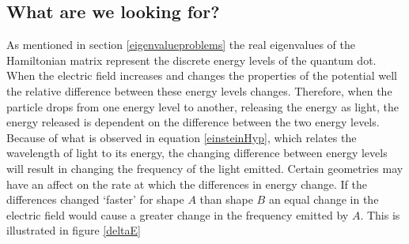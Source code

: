\documentclass[authoryearcitations]{UoYCSproject}
\begin{document}
\subsection{What are we looking for?}
As mentioned in section \ref{eigenvalueproblems} the real eigenvalues of the Hamiltonian matrix represent the discrete 
energy levels of the quantum dot. When the electric field increases and changes the properties of the potential well
the relative difference between these energy levels changes. Therefore, when the particle drops from one energy level
to another, releasing the energy as light, the energy released is dependent on the difference between the two energy levels.
Because of what is observed in equation \ref{einsteinHyp}, which relates the wavelength of light to its energy, the changing
difference between energy levels will result in changing the frequency of the light emitted. Certain geometries may have an 
affect on the rate at which the differences in energy change. If the differences changed `faster' for shape $A$ than shape $B$
an equal change in the electric field would cause a greater change in the frequency emitted by $A$. This is illustrated in 
figure \ref{deltaE}
\end{document}

